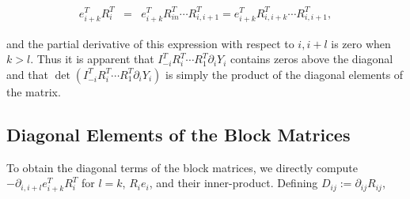\documentclass[ba]{imsart}
\numberwithin{equation}{section}
\theoremstyle{plain}
\begin{document}
\begin{eqnarray}
e_{i+k}^T R_i^T &=&  e_{i+k}^T R_{in}^T \cdots R_{i,i+1}^T = e_{i+k}^T R_{i,i+k}^T \cdots R_{i,i+1}^T,
\end{eqnarray}

\noindent and the partial derivative of this expression with respect to $i,i+l$ is zero when $k > l$. Thus it is apparent that $I_{-i}^T R_i^T \cdots R_1^T \partial_{i} Y_i $ contains zeros above the diagonal and that $\det \left( I_{-i}^T R_i^T \cdots R_1^T \partial_{i} Y_i \right)$ is simply the product of the diagonal elements of the matrix.

\subsection{Diagonal Elements of the Block Matrices}
To obtain the diagonal terms of the block matrices, we directly compute $-\partial_{i,i+l} e_{i+k}^T R_i^T$ for $l=k$, $R_i e_i$, and their inner-product. Defining $D_{ij} := \partial_{ij} R_{ij}$,
\end{document}
